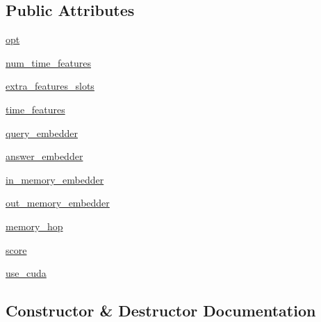 \subsection*{Public Attributes}
\begin{DoxyCompactItemize}
\item 
\hyperlink{classparlai_1_1agents_1_1legacy__agents_1_1memnn_1_1modules__v0_1_1MemNN_ab39560751f2c13da93f438dfbe90a66a}{opt}
\item 
\hyperlink{classparlai_1_1agents_1_1legacy__agents_1_1memnn_1_1modules__v0_1_1MemNN_a9c8ebec671c266d2a04d2a6e237bdbd0}{num\+\_\+time\+\_\+features}
\item 
\hyperlink{classparlai_1_1agents_1_1legacy__agents_1_1memnn_1_1modules__v0_1_1MemNN_a243f67730dd9c23803a4ba3f7f564ddf}{extra\+\_\+features\+\_\+slots}
\item 
\hyperlink{classparlai_1_1agents_1_1legacy__agents_1_1memnn_1_1modules__v0_1_1MemNN_aa0f005c1f6bfa1a3bf50b552fdcca833}{time\+\_\+features}
\item 
\hyperlink{classparlai_1_1agents_1_1legacy__agents_1_1memnn_1_1modules__v0_1_1MemNN_a8cde58818c77ca537abd7e6f9be5c3b2}{query\+\_\+embedder}
\item 
\hyperlink{classparlai_1_1agents_1_1legacy__agents_1_1memnn_1_1modules__v0_1_1MemNN_a9d41205a1560d3d405b75dc20b58cbef}{answer\+\_\+embedder}
\item 
\hyperlink{classparlai_1_1agents_1_1legacy__agents_1_1memnn_1_1modules__v0_1_1MemNN_a12f680e66ae1f4bf25a20f6270859b0b}{in\+\_\+memory\+\_\+embedder}
\item 
\hyperlink{classparlai_1_1agents_1_1legacy__agents_1_1memnn_1_1modules__v0_1_1MemNN_a9fed7872092d6d4eb4e7ff8da716ce97}{out\+\_\+memory\+\_\+embedder}
\item 
\hyperlink{classparlai_1_1agents_1_1legacy__agents_1_1memnn_1_1modules__v0_1_1MemNN_acac058f9213df5ea5d607472cfd5973f}{memory\+\_\+hop}
\item 
\hyperlink{classparlai_1_1agents_1_1legacy__agents_1_1memnn_1_1modules__v0_1_1MemNN_a6210700dfc0cc07900406c9b48a8267c}{score}
\item 
\hyperlink{classparlai_1_1agents_1_1legacy__agents_1_1memnn_1_1modules__v0_1_1MemNN_a65fdd2bb8f070a9eb8b59698b814640c}{use\+\_\+cuda}
\end{DoxyCompactItemize}


\subsection{Constructor \& Destructor Documentation}
\mbox{\label{classparlai_1_1agents_1_1legacy__agents_1_1memnn_1_1modules__v0_1_1MemNN_a31358714b5f07c4d040a1ed649eb5bc1}} 
